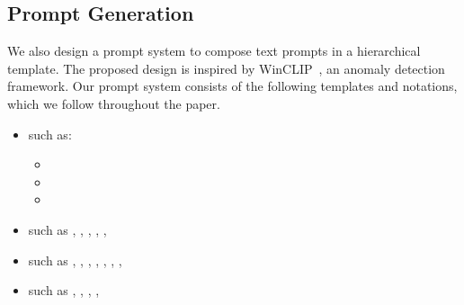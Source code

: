 \subsection{Prompt Generation}
We also design a prompt system to compose text prompts in a hierarchical template. The proposed design is inspired by WinCLIP~\cite{Jeong2023CVPR,zhu2024toward}, an anomaly detection framework. Our prompt system consists of the following templates and notations, which we follow throughout the paper.
\begin{itemize}
\item {} such as:
\begin{itemize}
    \item {}
    \item {}
    \item {}
\end{itemize}
\item {} such as , , , , , \etc
\vspace{1mm}
\item {} such as , , , , , , , \etc
\vspace{1mm}
\item {} such as , , , , \etc
\end{itemize}

